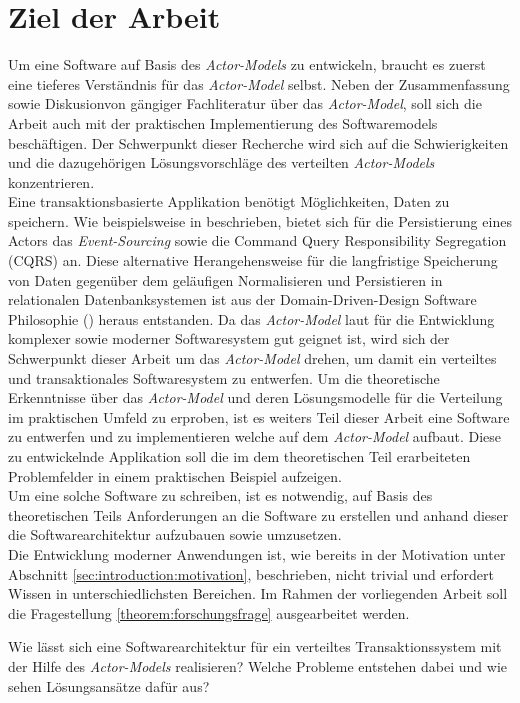 \section{Ziel der Arbeit}
\label{sec:introduction:workGoal}
\label{sec:introduction:forschungsfrage}
Um eine Software auf Basis des \textit{Actor-Models} zu entwickeln, braucht es zuerst eine tieferes Verständnis für das \textit{Actor-Model}  selbst.  Neben der Zusammenfassung sowie Diskusionvon gängiger Fachliteratur über das \textit{Actor-Model}, soll sich die Arbeit auch mit der praktischen Implementierung des Softwaremodels beschäftigen. Der Schwerpunkt dieser Recherche wird sich auf die Schwierigkeiten und die dazugehörigen Lösungsvorschläge des verteilten \textit{Actor-Models}  konzentrieren. \\
Eine transaktionsbasierte Applikation benötigt Möglichkeiten, Daten zu speichern. Wie beispielsweise in \cite{Vernon2015ReactiveAkka} beschrieben, bietet sich für die Persistierung eines Actors das \textit{Event-Sourcing} sowie die {Command Query Responsibility Segregation (CQRS)} an. Diese alternative Herangehensweise für die langfristige Speicherung von Daten gegenüber dem geläufigen Normalisieren und Persistieren in relationalen Datenbanksystemen ist aus der Domain-Driven-Design Software Philosophie (\cite{Evans2004Domain-drivenSoftware}) heraus  entstanden. Da das \textit{Actor-Model} laut \cite{Vernon2015ReactiveAkka} für die Entwicklung komplexer sowie moderner Softwaresystem gut geignet ist, wird sich der Schwerpunkt dieser Arbeit um das \textit{Actor-Model} drehen, um damit ein verteiltes und transaktionales Softwaresystem zu entwerfen.
Um die theoretische Erkenntnisse über das \textit{Actor-Model}  und deren Lösungsmodelle für die Verteilung im praktischen Umfeld zu erproben, ist es weiters Teil dieser Arbeit eine Software zu entwerfen und zu implementieren welche auf dem \textit{Actor-Model} aufbaut. Diese zu entwickelnde Applikation soll die im dem theoretischen Teil erarbeiteten Problemfelder in einem praktischen Beispiel aufzeigen. \\
Um eine solche Software zu schreiben, ist es notwendig, auf Basis des theoretischen Teils Anforderungen an die Software zu erstellen und anhand dieser die Softwarearchitektur aufzubauen sowie umzusetzen. \\
Die Entwicklung moderner Anwendungen ist, wie bereits in der Motivation unter Abschnitt \ref{sec:introduction:motivation}, beschrieben, nicht trivial und erfordert Wissen in unterschiedlichsten Bereichen. Im Rahmen der vorliegenden Arbeit soll die Fragestellung \ref{theorem:forschungsfrage} ausgearbeitet werden. 
\begin{Theorem}
\label{theorem:forschungsfrage}
Wie lässt sich eine Softwarearchitektur für ein verteiltes Transaktionssystem mit der Hilfe des \textit{Actor-Models} realisieren? Welche Probleme entstehen dabei und wie sehen Lösungsansätze dafür aus?
\end{Theorem}

